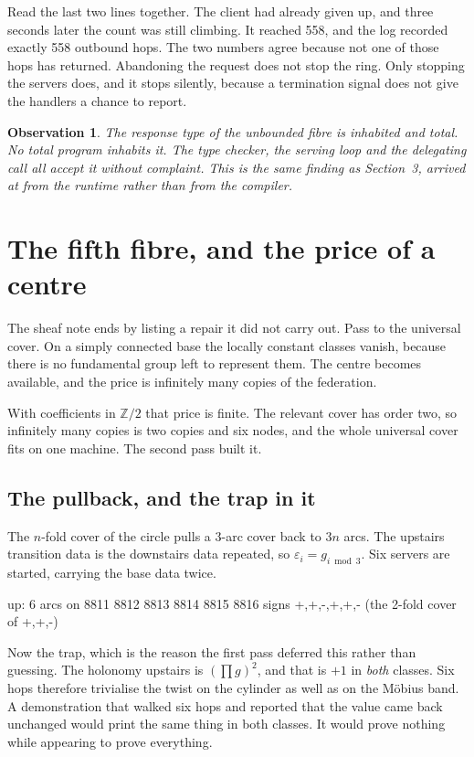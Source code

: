 \documentclass[11pt,a4paper]{article}
\newtheorem*{obs}{Observation}
\begin{document}
Read the last two lines together. The client had already given up, and three seconds
later the count was still climbing. It reached 558, and the log recorded exactly 558
outbound hops. The two numbers agree because not one of those hops has returned.
Abandoning the request does not stop the ring. Only stopping the servers does, and it
stops silently, because a termination signal does not give the handlers a chance to
report.

\begin{obs}
The response type of the unbounded fibre is inhabited and total. No total program
inhabits it. The type checker, the serving loop and the delegating call all accept it
without complaint. This is the same finding as Section~3, arrived at from the runtime
rather than from the compiler.
\end{obs}

\section{The fifth fibre, and the price of a centre}

The sheaf note ends by listing a repair it did not carry out. Pass to the universal
cover. On a simply connected base the locally constant classes vanish, because there
is no fundamental group left to represent them. The centre becomes available, and the
price is infinitely many copies of the federation.

With coefficients in $\mathbb{Z}/2$ that price is finite. The relevant cover has
order two, so infinitely many copies is two copies and six nodes, and the whole
universal cover fits on one machine. The second pass built it.

\subsection{The pullback, and the trap in it}

The $n$-fold cover of the circle pulls a $3$-arc cover back to $3n$ arcs. The
upstairs transition data is the downstairs data repeated, so
$\varepsilon_i = g_{i \bmod 3}$. Six servers are started, carrying the base data
twice.

\begin{term}
up: 6 arcs on 8811 8812 8813 8814 8815 8816   signs +,+,-,+,+,-   (the 2-fold cover of +,+,-)
\end{term}

Now the trap, which is the reason the first pass deferred this rather than guessing.
The holonomy upstairs is $(\prod g)^2$, and that is $+1$ in \emph{both} classes. Six
hops therefore trivialise the twist on the cylinder as well as on the M\"obius band.
A demonstration that walked six hops and reported that the value came back unchanged
would print the same thing in both classes. It would prove nothing while appearing to
prove everything.
\end{document}
